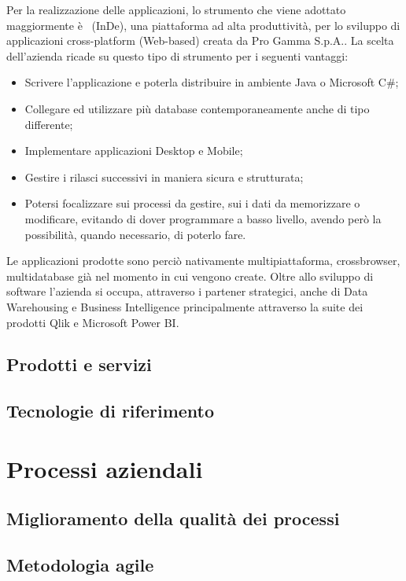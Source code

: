 Per la realizzazione delle applicazioni, lo strumento che viene adottato maggiormente è \inde\ (InDe), una piattaforma ad alta produttività, per lo sviluppo di applicazioni cross-platform (Web-based) creata da Pro Gamma S.p.A..
La scelta dell'azienda ricade su questo tipo di strumento per i seguenti vantaggi:
\begin{itemize}
	\item Scrivere l'applicazione e poterla distribuire in ambiente Java o Microsoft C\#;
	\item Collegare ed utilizzare più database contemporaneamente anche di tipo differente;
	\item Implementare applicazioni Desktop e Mobile;
	\item Gestire i rilasci successivi in maniera sicura e strutturata;
	\item Potersi focalizzare sui processi da gestire, sui i dati da memorizzare o modificare, evitando di dover programmare a basso livello, avendo però la possibilità, quando necessario, di poterlo fare.
\end{itemize}
Le applicazioni prodotte sono perciò nativamente multipiattaforma, crossbrowser, multidatabase già nel momento in cui vengono create.
Oltre allo sviluppo di software l'azienda si occupa, attraverso i partener strategici, anche di Data Warehousing e Business Intelligence principalmente attraverso la suite dei prodotti Qlik e Microsoft Power BI.\\

\subsection{Prodotti e servizi}

\subsection{Tecnologie di riferimento}


\section{Processi aziendali}
\subsection{Miglioramento della qualità dei processi}
\subsection{Metodologia agile}

